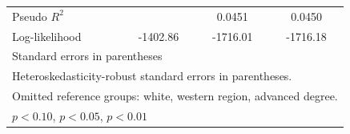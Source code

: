 \begin{table}[htbp]
\begin{tabular}{l*{3}{c}}
Pseudo $R^2$        &                     &      0.0451         &      0.0450         \\
Log-likelihood      &    -1402.86         &    -1716.01         &    -1716.18         \\
\bottomrule
\multicolumn{4}{l}{\footnotesize Standard errors in parentheses}\\
\multicolumn{4}{l}{\footnotesize Heteroskedasticity-robust standard errors in parentheses.}\\
\multicolumn{4}{l}{\footnotesize Omitted reference groups: white, western region, advanced degree.}\\
\multicolumn{4}{l}{\footnotesize \sym{*} \(p<0.10\), \sym{**} \(p<0.05\), \sym{***} \(p<0.01\)}\\
\end{tabular}
\end{table}
